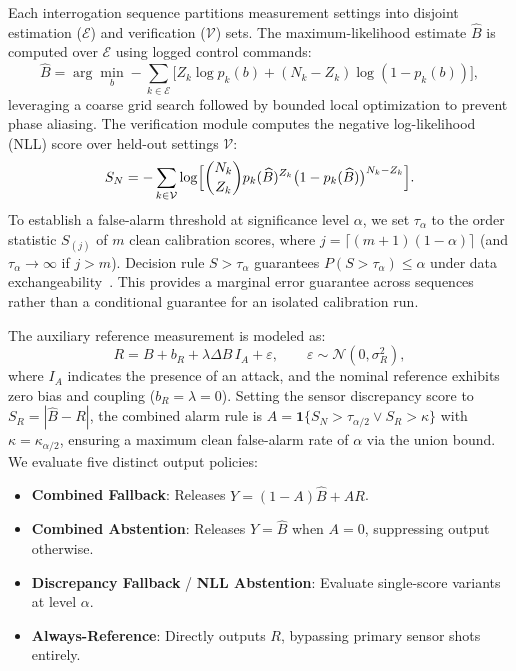 \documentclass[conference]{IEEEtran}
\newcommand{\Bhat}{\widehat{B}}
\newcommand{\ind}{\mathbf{1}}
\newcommand{\Normal}{\mathcal{N}}
\begin{document}
Each interrogation sequence partitions measurement settings into disjoint estimation ($\mathcal E$) and verification ($\mathcal V$) sets. The maximum-likelihood estimate $\Bhat$ is computed over $\mathcal E$ using logged control commands:
\begin{equation}
 \Bhat=\arg\min_{b}
 -\sum_{k\in\mathcal E}\bigl[Z_k\log p_k(b)+(N_k-Z_k)\log(1-p_k(b))\bigr],
 \label{eq:mle}
\end{equation}
leveraging a coarse grid search followed by bounded local optimization to prevent phase aliasing. The verification module computes the negative log-likelihood (NLL) score over held-out settings $\mathcal V$:
\begin{equation}
 S_N=-\sum_{k\in\mathcal V}\log\Bigl[{N_k\choose Z_k}
 p_k(\Bhat)^{Z_k}\bigl(1-p_k(\Bhat)\bigr)^{N_k-Z_k}\Bigr].
 \label{eq:nll}
\end{equation}
To establish a false-alarm threshold at significance level $\alpha$, we set $\tau_\alpha$ to the order statistic $S_{(j)}$ of $m$ clean calibration scores, where $j = \lceil(m+1)(1-\alpha)\rceil$ (and $\tau_\alpha \rightarrow \infty$ if $j > m$). Decision rule $S > \tau_\alpha$ guarantees $P(S > \tau_\alpha) \le \alpha$ under data exchangeability~\cite{angelopoulos2023conformal}. This provides a marginal error guarantee across sequences rather than a conditional guarantee for an isolated calibration run.

The auxiliary reference measurement is modeled as:
\begin{equation}
 R=B+b_R+\lambda\Delta B\,I_A+\varepsilon,\qquad
 \varepsilon\sim\Normal(0,\sigma_R^2),
 \label{eq:reference}
\end{equation}
where $I_A$ indicates the presence of an attack, and the nominal reference exhibits zero bias and coupling ($b_R = \lambda = 0$). Setting the sensor discrepancy score to $S_R = |\Bhat - R|$, the combined alarm rule is $A = \ind\{S_N > \tau_{\alpha/2} \lor S_R > \kappa\}$ with $\kappa = \kappa_{\alpha/2}$, ensuring a maximum clean false-alarm rate of $\alpha$ via the union bound. We evaluate five distinct output policies:
\begin{itemize}
\item \textbf{Combined Fallback}: Releases $Y = (1-A)\Bhat + AR$.
\item \textbf{Combined Abstention}: Releases $Y = \Bhat$ when $A = 0$, suppressing output otherwise.
\item \textbf{Discrepancy Fallback} / \textbf{NLL Abstention}: Evaluate single-score variants at level $\alpha$.
\item \textbf{Always-Reference}: Directly outputs $R$, bypassing primary sensor shots entirely.
\end{itemize}
\end{document}
